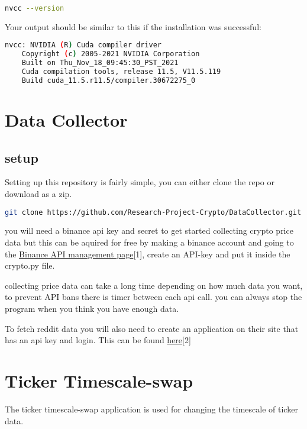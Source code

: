 \documentclass[12pt,a4paper]{article}
\begin{document}
\begin{lstlisting}[language=bash]
    nvcc --version
\end{lstlisting}

Your output should be similar to this if the installation was successful:

\begin{lstlisting}[language=bash]
	nvcc: NVIDIA (R) Cuda compiler driver
	Copyright (c) 2005-2021 NVIDIA Corporation
	Built on Thu_Nov_18_09:45:30_PST_2021
	Cuda compilation tools, release 11.5, V11.5.119
	Build cuda_11.5.r11.5/compiler.30672275_0
\end{lstlisting}

\section{Data Collector}

\subsection{setup}
Setting up this repository is fairly simple, you can either clone the repo or download as a zip.

\begin{lstlisting}[language=bash]
git clone https://github.com/Research-Project-Crypto/DataCollector.git 
\end{lstlisting}

you will need a binance api key and secret to get started collecting crypto price data but this can be aquired for free by making a binance account and going to the \href{https://www.binance.com/en/my/settings/api-management}{Binance API management page}[1], create an API-key and put it inside the crypto.py file.

collecting price data can take a long time depending on how much data you want, to prevent API bans there is timer between each api call. you can always stop the program when you think you have enough data.

To fetch reddit data you will also need to create an application on their site that has an api key and login. This can be found \href{https://www.reddit.com/prefs/apps}{here}[2]

\section{Ticker Timescale-swap}

The ticker timescale-swap application is used for changing the timescale of ticker data.
\end{document}
